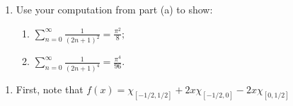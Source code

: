 \documentclass[11pt]{article}
\begin{document}
\begin{enumerate}[leftmargin=2em, label=\arabic*.]
\begin{enumerate}[label=(\alph*), leftmargin=2em]
        \item Use your computation from part (a) to show:
        \begin{enumerate}[label=\roman*., leftmargin=2em]
            \item $\displaystyle \sum_{n=0}^{\infty}\frac{1}{(2n+1)^2}=\frac{\pi^2}{8};$
            \item $\displaystyle \sum_{n=0}^{\infty}\frac{1}{(2n+1)^4}=\frac{\pi^4}{96}.$
        \end{enumerate}
    \end{enumerate}



    \begin{enumerate}
        \item First, note that $f(x)= \chi_{[-1 / 2, 1 / 2]} + 2x\chi_{[-1 / 2, 0]} - 2x \chi_{[0, 1 / 2]}$


\end{enumerate}
\end{enumerate}
\end{document}
